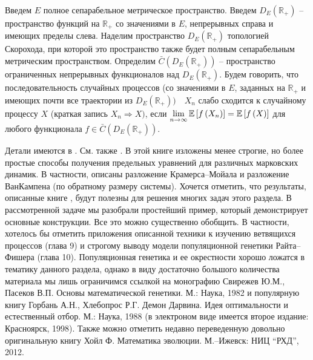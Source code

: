 \begin{remark}
Введем $E$ полное 
сепарабельное метрическое пространство. Введем $D_E \left( {{\mathbb R}_+ } 
\right)$ -- пространство функций на ${\mathbb R}_+ $ со значениями в $E$, 
непрерывных справа и имеющих пределы слева. Наделим пространство $D_E \left( 
{{\mathbb R}_+ } \right)$ топологией Скорохода, при которой это пространство 
также будет полным сепарабельным метрическим пространством. Определим $\bar 
{C}\left( {D_E \left( {{\mathbb R}_+ } \right)} \right)$ -- пространство 
ограниченных непрерывных функционалов над $D_E \left( {{\mathbb R}_+ } \right)$. 
Будем говорить, что последовательность случайных процессов (со значениями в 
$E$, заданных на ${\mathbb R}_+ $ и имеющих почти все траектории из $D_E \left( 
{{\mathbb R}_+ } \right)) \quad X_n $ слабо сходится к случайному процессу $X$ 
(краткая запись $X_n \Rightarrow X)$, если $\mathop {\lim }\limits_{n\to 
\infty } \mathrm{{\mathbb E}}\left[ {f\left( {X_n } \right)} \right]=\mathrm{{\mathbb E}}\left[ {f\left( X 
\right)} \right]$ для любого функционала $f\in \bar {C}\left( {D_E \left( 
{{\mathbb R}_+ } \right)} \right)$.

Детали имеются в \cite{101}. См. также \cite{333}. В этой книге изложены менее строгие, но 
более простые способы получения предельных уравнений для различных 
марковских динамик. В частности, описаны разложение Крамерса--Мойала и 
разложение ВанКампена (по обратному размеру системы). Хочется отметить, что 
результаты, описанные книге \cite{333}, будут полезны для решения многих задач 
этого раздела. В рассмотренной задаче мы разобрали простейший пример, 
который демонстрирует основные конструкции. Все это можно существенно 
обобщить. В частности, хотелось бы отметить приложения описанной техники к 
изучению ветвящихся процессов (глава 9) и строгому выводу модели 
популяционной генетики Райта--Фишера (глава 10). Популяционная генетика и ее 
окрестности хорошо ложатся в тематику данного раздела, однако в виду 
достаточно большого количества материала мы лишь ограничимся ссылкой на 
монографию Свирежев Ю.М., Пасеков В.П. Основы математической генетики. М.: Наука, 1982 и популярную 
книгу Горбань А.Н., Хлебопрос Р.Г. Демон Дарвина. Идея оптимальности и естественный отбор. М.: Наука, 
1988 (в электроном виде имеется второе издание: Красноярск, 1998). Также 
можно отметить недавно переведенную довольно оригинальную книгу Хойл Ф. Математика 
эволюции. М.--Ижевск: НИЦ ``РХД'', 2012. 
\end{remark}

